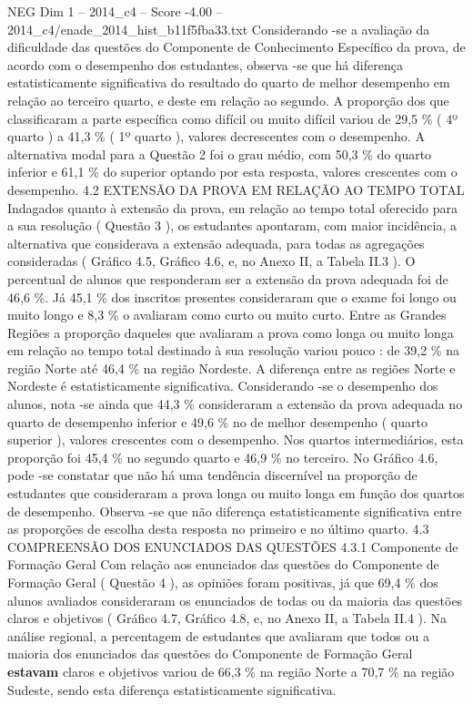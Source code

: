 \begin{textsample}{NEG Dim 1 – 2014\_c4 – Score -4.00 – 2014\_c4/enade\_2014\_hist\_b11f5fba33.txt}
Considerando -se a avaliação da dificuldade das questões do Componente de Conhecimento Específico da prova, de acordo com o desempenho dos estudantes, observa -se que há diferença estatisticamente significativa do resultado do quarto de melhor desempenho em relação ao terceiro quarto, e deste em relação ao segundo.
A proporção dos que classificaram a parte específica como difícil ou muito difícil variou de 29,5 \% ( 4º quarto ) a 41,3 \% ( 1º quarto ), valores decrescentes com o desempenho.
A alternativa modal para a Questão 2 foi o grau médio, com 50,3 \% do quarto inferior e 61,1 \% do superior optando por esta resposta, valores crescentes com o desempenho. 4.2 EXTENSÃO DA PROVA EM RELAÇÃO AO TEMPO TOTAL Indagados quanto à extensão da prova, em relação ao tempo total oferecido para a sua resolução ( Questão 3 ), os estudantes apontaram, com maior incidência, a alternativa que considerava a extensão adequada, para todas as agregações consideradas ( Gráfico 4.5, Gráfico 4.6, e, no Anexo II, a Tabela II.3 ).
O percentual de alunos que responderam ser a extensão da prova adequada foi de 46,6 \%.
Já 45,1 \% dos inscritos presentes consideraram que o exame foi longo ou muito longo e 8,3 \% o avaliaram como curto ou muito curto.
Entre as Grandes Regiões a proporção daqueles que avaliaram a prova como longa ou muito longa em relação ao tempo total destinado à sua resolução variou pouco : de 39,2 \% na região Norte até 46,4 \% na região Nordeste.
A diferença entre as regiões Norte e Nordeste é estatisticamente significativa.
Considerando -se o desempenho dos alunos, nota -se ainda que 44,3 \% consideraram a extensão da prova adequada no quarto de desempenho inferior e 49,6 \% no de melhor desempenho ( quarto superior ), valores crescentes com o desempenho.
Nos quartos intermediários, esta proporção foi 45,4 \% no segundo quarto e 46,9 \% no terceiro.
No Gráfico 4.6, pode -se constatar que não há uma tendência discernível na proporção de estudantes que consideraram a prova longa ou muito longa em função dos quartos de desempenho.
Observa -se que não diferença estatisticamente significativa entre as proporções de escolha desta resposta no primeiro e no último quarto. 4.3 COMPREENSÃO DOS ENUNCIADOS DAS QUESTÕES 4.3.1 Componente de Formação Geral Com relação aos enunciados das questões do Componente de Formação Geral ( Questão 4 ), as opiniões foram positivas, já que 69,4 \% dos alunos avaliados consideraram os enunciados de todas ou da maioria das questões claros e objetivos ( Gráfico 4.7, Gráfico 4.8, e, no Anexo II, a Tabela II.4 ).
Na análise regional, a percentagem de estudantes que avaliaram que todos ou a maioria dos enunciados das questões do Componente de Formação Geral \textbf{estavam} claros e objetivos variou de 66,3 \% na região Norte a 70,7 \% na região Sudeste, sendo esta diferença estatisticamente significativa.

\end{textsample}
